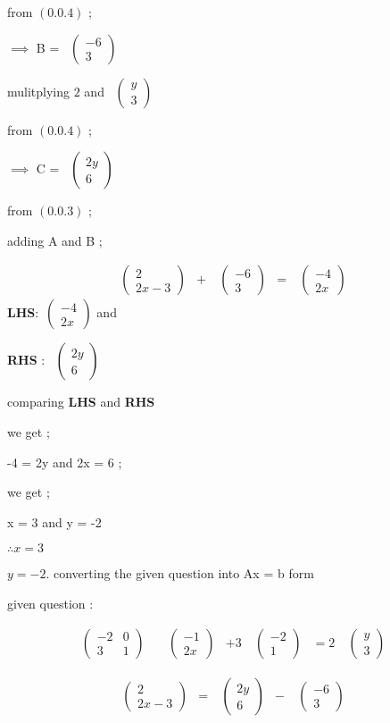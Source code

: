 \documentclass[journal,12pt,twocolumn]{IEEEtran}
\theoremstyle{remark}
\newcommand{\myvec}[1]{\ensuremath{\begin{pmatrix}#1\end{pmatrix}}}
\numberwithin{equation}{subsection}
\begin{document}
     from $(0.0.4)$ ;
      
       $\implies$  B = \ \myvec{-6 \\3 } 
       
       mulitplying 
    $2$ and  
\ \myvec{y \\ 3 } 

      
     from $(0.0.4)$ ;
      
       $\implies$  C = 
\ \myvec{2y \\6 } 
      
      from $(0.0.3)$ ; 
      
      adding A and B ;
       
     \begin{align}
&\ \myvec{2\\2x-3 }& +
&\ \myvec{-6\\3} & = 
&\ \myvec{-4\\2x} &
\end{align} 
      \newpage
\textbf{LHS}:\ \myvec{-4 \\2x } 
      and 
     
  \textbf {RHS} : 
\ \myvec{2y \\6 } 
      
      
      comparing \textbf{LHS} and \textbf{RHS}
      
      we get ;
      
      -4 = 2y and 2x = 6 ;
      
      we get ;
      
      x = 3 and y = -2 
      
  $ \therefore x = 3 $
     
                 $   y = -2 $.
     \newpage
   converting the given question into Ax = b form 
   
   given question :
   
     \begin{align}
&\ \myvec{-2 & 0\\3 & 1}&
&\ \myvec{-1\\2x}&
 + 3&\ \myvec{-2 \\1 }&
 = 2&\ \myvec{y \\3 }& 
      \end{align} 
      
     \begin{align}
&\ \myvec{2\\2x-3 }& =
&\ \myvec{2y\\6} &- 
&\ \myvec{-6\\3} &
\end{align} 
      
\end{document}
